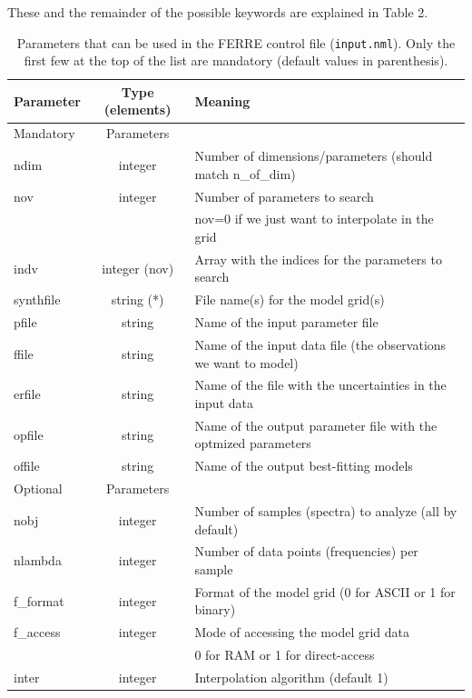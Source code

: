 \documentclass[12pt]{article}
\begin{document}
These and the remainder of the 
possible keywords are explained in Table 2.

\begin{table}
\label{t2}
\caption{Parameters that can be used in the FERRE control file ({\tt input.nml}). 
Only the first few at the top of the list are mandatory (default values in parenthesis).}
\begin{tabular}{lcl}
\hline
Parameter  & Type (elements) & Meaning \\
\hline
\hline
Mandatory  & Parameters \\
\hline
ndim     & integer            & Number of dimensions/parameters (should match 
n\_of\_dim) \\
nov      & integer            & Number of parameters to search \\
         &                    & nov=0 if we just want to interpolate in the grid \\
indv     & integer (nov)         & Array with the indices for the parameters to search \\
synthfile & string (*)           & File name(s) for the model grid(s) \\
pfile     &   string             & Name of the input parameter file \\
ffile     &   string             & Name of the input data file (the observations we want to model) \\
erfile    &   string             & Name of the file with the uncertainties 
	in the input data\\
opfile    &   string             & Name of the output parameter file with the optmized parameters \\
offile    &   string             & Name of the output best-fitting models \\ 
\hline
Optional   & Parameters \\
\hline 
nobj      &    integer           & Number of samples (spectra) to analyze (all by default) \\
nlambda   &    integer           & Number of data points (frequencies) per sample \\
f\_format  &    integer           & Format of the model grid (0 for ASCII or 1 for binary)  \\
f\_access  &    integer           & Mode of accessing the model grid data \\
          &                       & 0 for RAM or  1 for direct-access \\
inter     &     integer           &  Interpolation algorithm (default 1) \\

\end{tabular}
\end{table}
\end{document}
